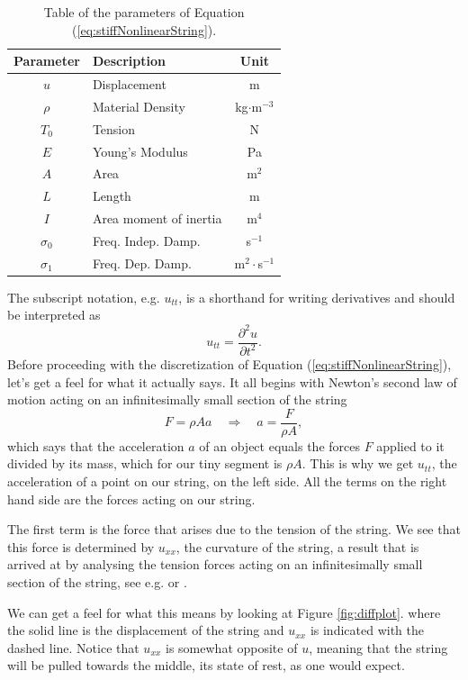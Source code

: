 \documentclass{article}
\begin{document}
\begin{table}[h]
\centering
\begin{tabularx}{\linewidth}{c | l | c}
  Parameter & Description & Unit \\
  \hline
  $u$ & Displacement & m \\
  $\rho$ & Material Density & kg$\cdot$m$^{-3}$ \\
  $T_0$ & Tension & N \\
  $E$ & Young's Modulus & Pa \\
  $A$ & Area & m$^2$ \\
  $L$ & Length & m \\
  $I$ & Area moment of inertia & m$^4$\\
  $\sigma_0$ & Freq. Indep. Damp. & s$^{-1}$\\
  $\sigma_1$ & Freq. Dep. Damp. & m$^2 \cdot$s$^{-1}$
\end{tabularx}
\label{table:stringParamters}
\caption{Table of the parameters of Equation (\ref{eq:stiffNonlinearString}).}
\end{table}
%
\noindent The subscript notation, e.g. $u_{tt}$, is a shorthand for writing derivatives and should be interpreted as
\begin{equation}
  u_{tt} = \frac{\partial^2u}{\partial t^2}.
\end{equation}
%
Before proceeding with the discretization of Equation (\ref{eq:stiffNonlinearString}), let's get a feel for what it actually says.
It all begins with Newton's second law of motion acting on an infinitesimally small section of the string
\begin{equation}
  F = \rho A a \quad \Rightarrow \quad a = \frac{F}{\rho A},
\end{equation}
which says that the acceleration $a$ of an object equals the forces $F$ applied to it divided by its mass, which for our tiny segment is $\rho A$.
This is why we get $u_{tt}$, the acceleration of a point on our string, on the left side.
All the terms on the right hand side are the forces acting on our string.

The first term is the force that arises due to the tension of the string.
We see that this force is determined by $u_{xx}$, the curvature of the string, a result that is arrived at by analysing the tension forces acting on an infinitesimally small section of the string, see e.g. \cite[Chapter~2]{fletcher_physics_1998} or \cite[Chapter~6]{bilbao_numerical_2009}.

We can get a feel for what this means by looking at Figure \ref{fig:diffplot}. where the solid line is the displacement of the string and $u_{xx}$ is indicated with the dashed line.
Notice that $u_{xx}$ is somewhat opposite of $u$, meaning that the string will be pulled towards the middle, its state of rest, as one would expect.
\end{document}
